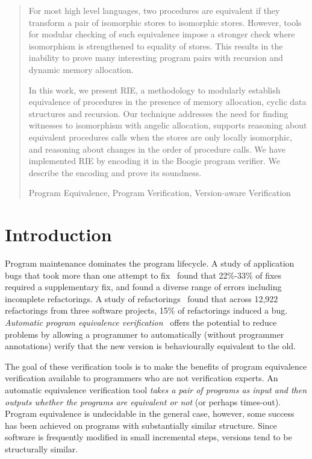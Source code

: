 \documentclass[runningheads,a4paper]{llncs}
\newcommand{\keywords}[1]{\par\addvspace\baselineskip
\noindent\keywordname\enspace\ignorespaces#1}
\begin{document}
\begin{abstract}
For most high level languages, two procedures are equivalent if they transform a pair of isomorphic stores to isomorphic stores. However, tools for modular checking of such equivalence impose a stronger check where isomorphism is strengthened to equality of stores. This results in the inability to prove many interesting program pairs with recursion and dynamic memory allocation.

In this work, we present RIE, a methodology to modularly establish equivalence of procedures in the presence of memory allocation, cyclic data structures and recursion. Our technique addresses the need for finding witnesses to isomorphism with angelic allocation, supports reasoning about equivalent procedures calls when the stores are only locally isomorphic, and reasoning about changes in the order of procedure calls. We have implemented RIE by encoding it in the Boogie program verifier. We describe the encoding and prove its soundness.

\keywords{Program Equivalence, Program Verification, Version-aware Verification}
\end{abstract}

\section{Introduction}

Program maintenance dominates the program lifecycle. A study of application bugs that took more than one attempt to fix~\cite{Park2012} found that 22\%-33\% of fixes required a supplementary fix, and found a diverse range of errors including incomplete refactorings. A study of refactorings~\cite{Bavota2012} found that across 12,922 refactorings from three software projects, 15\% of refactorings induced a bug. \emph{Automatic program equivalence verification}~\cite{Godlin09,Lahiri2012,Partush2014,Felsing2014} offers the potential to reduce problems by allowing a programmer to automatically (without programmer annotations) verify that the new version is behaviourally equivalent to the old.

The goal of these verification tools is to make the benefits of program equivalence verification available to programmers who are not verification experts. An automatic equivalence verification tool \emph{takes a pair of programs as input and then outputs whether the programs are equivalent or not} (or perhaps times-out). Program equivalence is undecidable in the general case, however, some success has been achieved on programs with substantially similar structure. Since software is frequently modified in small incremental steps, versions tend to be structurally similar. 
\end{document}
